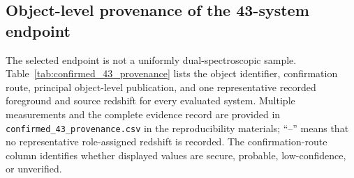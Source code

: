 \subsection{Object-level provenance of the 43-system endpoint}

\label{app:confirmed_provenance}
The selected endpoint is not a uniformly dual-spectroscopic
sample. Table~\ref{tab:confirmed_43_provenance}
lists the object identifier, confirmation route, principal
object-level publication, and one representative recorded
foreground and source redshift for every evaluated system.
Multiple measurements and the complete evidence record are provided in
\texttt{confirmed\_43\_provenance.csv} in the reproducibility materials;
``--'' means that no
representative role-assigned redshift is recorded. The
confirmation-route column identifies whether displayed values
are secure, probable, low-confidence, or unverified.

